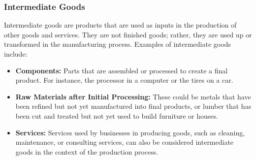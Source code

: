 \documentclass{report}
\begin{document}
     \subsubsection{Intermediate Goods}
     \bigbreak \noindent 
     Intermediate goods are products that are used as inputs in the production of other goods and services. They are not finished goods; rather, they are used up or transformed in the manufacturing process. Examples of intermediate goods include:
     \begin{itemize}
         \item \textbf{Components:} Parts that are assembled or processed to create a final product. For instance, the processor in a computer or the tires on a car.
         \item \textbf{Raw Materials after Initial Processing:} These could be metals that have been refined but not yet manufactured into final products, or lumber that has been cut and treated but not yet used to build furniture or houses.
         \item \textbf{Services:} Services used by businesses in producing goods, such as cleaning, maintenance, or consulting services, can also be considered intermediate goods in the context of the production process.
     \end{itemize}

     \bigbreak \noindent 
\end{document}
